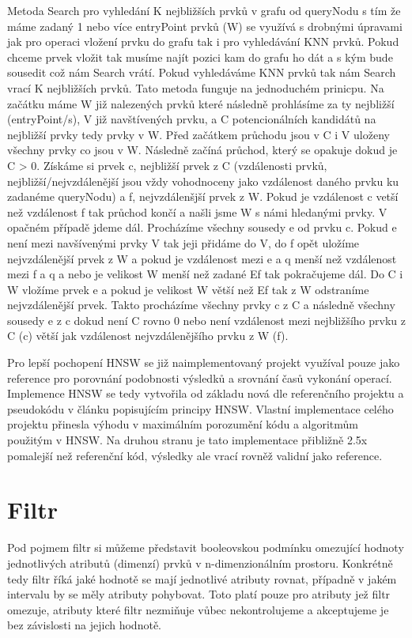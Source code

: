 \documentclass[czech,semestral,dept460,male,csharp,cpdeclaration]{diploma}
\begin{document}
		Metoda Search pro vyhledání K nejbližších prvků v grafu od queryNodu s tím že máme zadaný 1 nebo více entryPoint prvků (W) se využívá s drobnými úpravami jak pro operaci vložení prvku do grafu tak i pro vyhledávání KNN prvků. Pokud chceme prvek vložit tak musíme najít pozici kam do grafu ho dát a s kým bude sousedit což nám Search vrátí. Pokud vyhledáváme KNN prvků tak nám Search vrací K nejbližších prvků. Tato metoda funguje na jednoduchém prinicpu. Na začátku máme W již nalezených prvků které následně prohlásíme za ty nejbližší (entryPoint/s), V již navštívených prvku, a C potencionálních kandidátů na nejbližší prvky tedy prvky v W. Před začátkem průchodu jsou v C i V uloženy všechny prvky co jsou v W. Následně začíná průchod, který se opakuje dokud je C > 0. Získáme si prvek c, nejbližší prvek z C (vzdálenosti prvků, nejbližší/nejvzdálenější jsou vždy vohodnoceny jako vzdálenost daného prvku ku zadanéme queryNodu) a f, nejvzdálenšjší prvek z W. Pokud je vzdálenost c vetší než vzdálenost f tak průchod končí a našli jsme W s námi hledanými prvky. V opačném případě jdeme dál. Procházíme všechny sousedy e od prvku c. Pokud e není mezi navšívenými prvky V tak jeji přidáme do V, do f opět uložíme nejvzdálenější prvek z W a pokud je vzdálenost mezi e a q menší než vzdálenost mezi f a q a nebo je velikost W menší než zadané Ef tak pokračujeme dál. Do C i W vložíme prvek e a pokud je velikost W větší než Ef tak z W odstraníme nejvzdálenější prvek. Takto procházíme všechny prvky c z C a následně všechny sousedy e z c dokud není C rovno 0 nebo není vzdálenost mezi nejbližšího prvku z C (c) větší jak vzdálenost nejvzdálenějšího prvku z W (f).
	
		Pro lepší pochopení HNSW se již naimplementovaný projekt využíval pouze jako reference pro porovnání podobnosti výsledků a srovnání časů vykonání operací. Implemence HNSW se tedy vytvořila od základu nová dle referenčního projektu a pseudokódu v článku popisujícím principy HNSW. Vlastní implementace celého projektu přinesla výhodu v maximálním porozumění kódu a algoritmům použitým v HNSW. Na druhou stranu je tato implementace přibližně 2.5x pomalejší než referenční kód, výsledky ale vrací rovněž validní jako reference.
		
		
	
	\chapter{Filtr}
	
		Pod pojmem filtr si můžeme představit booleovskou podmínku omezující hodnoty jednotlivých atributů (dimenzí) prvků v n-dimenzionálním prostoru. Konkrétně tedy filtr říká jaké hodnotě se mají jednotlivé atributy rovnat, případně v jakém intervalu by se měly atributy pohybovat. Toto platí pouze pro atributy jež filtr omezuje, atributy které filtr nezmiňuje vůbec nekontrolujeme a akceptujeme je bez závislosti na jejich hodnotě.
		
\end{document}
